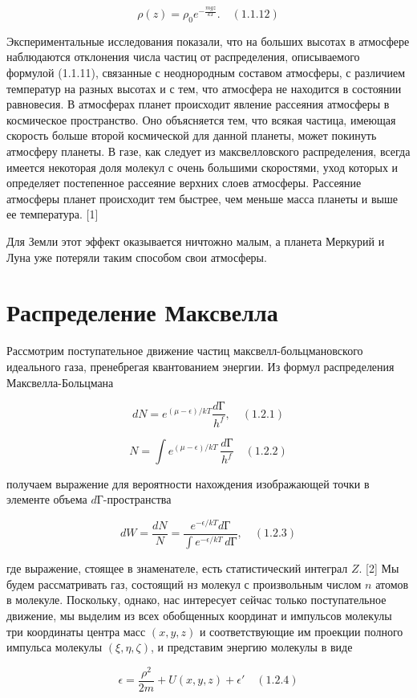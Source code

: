 $$\rho(z)= \rho_0 e^{-\frac{mgz}{kT}}. \quad (1.1.12)$$

Экспериментальные исследования показали, что на больших высотах в атмосфере наблюдаются отклонения числа частиц от распределения, описываемого формулой (1.1.11), связанные с неоднородным составом атмосферы, с различием температур на разных высотах и с тем, что атмосфера не находится в состоянии равновесия.
В атмосферах планет происходит явление рассеяния атмосферы в космическое пространство. Оно объясняется тем, что всякая частица, имеющая скорость больше второй космической для данной планеты, может покинуть атмосферу планеты. В газе, как следует из максвелловского распределения, всегда имеется некоторая доля молекул с очень большими скоростями, уход которых и определяет постепенное рассеяние верхних слоев атмосферы. Рассеяние атмосферы планет происходит тем быстрее, чем меньше масса планеты и выше ее температура. [1]

Для Земли этот эффект оказывается ничтожно малым, а планета Меркурий и Луна уже потеряли таким способом свои атмосферы.

\section{Распределение Максвелла}

Рассмотрим поступательное движение частиц максвелл-больцмановского идеального газа, пренебрегая квантованием энергии. Из формул распределения Максвелла-Больцмана

$$dN=e^{(\mu - \epsilon)/kT} \frac{dГ}{h^f}, \quad (1.2.1)$$

$$N=\int e^{(\mu - \epsilon)/kT} \,\frac{dГ}{h^f} \quad (1.2.2)$$

получаем выражение для вероятности нахождения изображающей точки в элементе объема $d\text{Г}$-пространства

$$ dW=\frac{dN}{N}=\frac{e^{- \epsilon/kT}d\text{Г}}{\int e^{- \epsilon/kT}\,dГ}, \quad (1.2.3)$$

где выражение, стоящее в знаменателе, есть статистический интеграл $Z$. [2] Мы будем рассматривать газ, состоящий нз молекул с произвольным числом $n$ атомов в молекуле. Поскольку, однако, нас интересует сейчас только поступательное движение, мы выделим из всех обобщенных координат и импульсов молекулы три координаты центра масс $(x, y, z)$ и соответствующие им проекции полного импульса молекулы $(\xi,\eta, \zeta)$, и представим энергию молекулы в виде

$$\epsilon = \frac{\rho^2}{2m}+U(x,y,z)+\epsilon' \quad (1.2.4)$$

